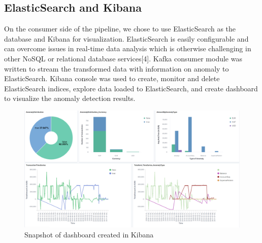 \documentclass{article}
\begin{document}
\subsection{ElasticSearch and Kibana}

On the consumer side of the pipeline, we chose to use ElasticSearch as the database and Kibana for visualization. ElasticSearch is easily configurable and can overcome issues in real-time data analysis which is otherwise challenging in other NoSQL or relational database services[4]. Kafka consumer module was written to stream the transformed data with information on anomaly to ElasticSearch. Kibana console was used to create, monitor and delete ElasticSearch indices, explore data loaded to ElasticSearch, and create dashboard to visualize the anomaly detection results.

\begin{figure}[h!]
\centering
\includegraphics[width=\textwidth]{Dashboard_snapshot.PNG}
\caption{Snapshot of dashboard created in Kibana}
\label{fig:OuptutDashboard}
\end{figure}
\end{document}
